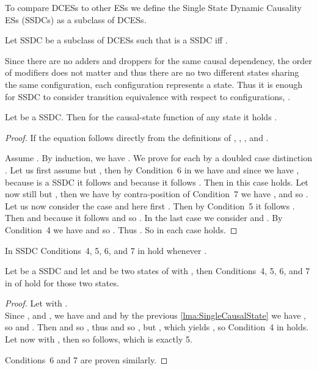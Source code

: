 \documentclass[runningheads,a4paper]{llncs}
\begin{document}
To compare DCESs to other ESs we define the Single State Dynamic Causality ESs
(SSDCs) as a subclass of DCESs.

\begin{definition}
\label{def:SingleStateDC}
Let SSDC be a subclass of DCESs such that  is a SSDC iff
.
\end{definition}
Since there are no adders and droppers for the same causal dependency, the order
of modifiers does not matter and thus there are no two different states sharing
the same configuration, \ie each configuration represents a state. Thus it is
enough for SSDC to consider transition equivalence with respect to
configurations, \ie .

\begin{lemma}
\label{lma:SingleCausalState}
Let  be a SSDC. Then for the causal-state function  of any
state  it holds .
\end{lemma}

\begin{proof}
If  the equation follows directly from the definitions of , , , and .

Assume . By induction, we have .
We prove for each  by a doubled case distinction . Let us first assume  but , then by Condition~6 in \cite{dynamicCausality15} we have  and since  we have , because  is a SSDC it follows  and because  it follows . Then in this case  holds. Let now still  but , then we have by contra-position of Condition~7 we have , and so  . Let us now consider the case  and here first . Then by Condition~5 it follows . Then  and because  it follows  and so . In the last case we consider  and  . By Condition~4 we have  and so . Thus . So in each case  holds.
\end{proof}


In SSDC Conditions~4, 5, 6, and 7 in \cite{dynamicCausality15} hold whenever .

\begin{lemma}
\label{lma:SSDCstateProp}
Let  be a SSDC and let  and  be two states of  with , then Conditions~4, 5, 6, and 7 in \cite{dynamicCausality15} of  hold for those two states.
\end{lemma}

\begin{proof}
Let  with .\\
Since ,  and , we have  and  and by the previous \lem\ref{lma:SingleCausalState} we have , so  and . Then  and so , thus  and so , but , which yields , so Condition~4 in \cite{dynamicCausality15} holds. Let now  with , then  so  follows, which is exactly 5. 

Conditions~6 and 7 are proven similarly.
\end{proof}
\end{document}
